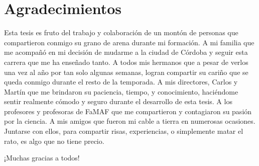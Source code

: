 \chapter*{\center \Large  Agradecimientos}
Esta tesis es fruto del trabajo y colaboración de un montón de personas que
compartieron conmigo su grano de arena durante mi formación. A mi familia que me
acompañó en mi decisión de mudarme a la ciudad de Córdoba y seguir esta carrera
que me ha enseñado tanto. A todos mis hermanos que a pesar de verlos una vez al
año por tan solo algunas semanas, logran compartir su cariño que se queda
conmigo durante el resto de la temporada. A mis directores, Carlos y Martín que
me brindaron su paciencia, tiempo, y conocimiento, haciéndome sentir realmente
cómodo y seguro durante el desarrollo de esta tesis. A los profesores y
profesoras de FaMAF que me compartieron y contagiaron su pasión por la ciencia.
A mis amigos que fueron mi cable a tierra en numerosas ocasiones. Juntarse con
ellos, para compartir risas, experiencias, o simplemente matar el rato, es algo
que no tiene precio.

¡Muchas gracias a todos!